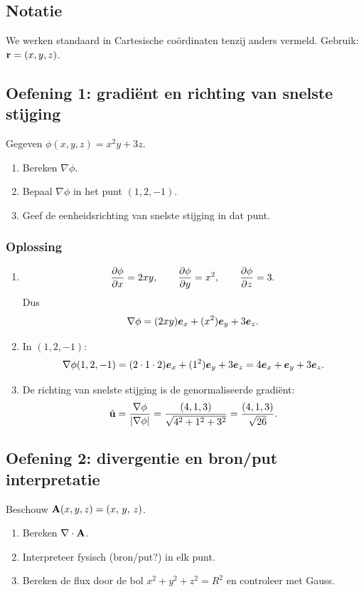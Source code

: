 \documentclass[11pt,a4paper]{article}
\begin{document}
    \subsection*{Notatie}
    We werken standaard in Cartesische co\"ordinaten tenzij anders vermeld.
    Gebruik: \(\vb{r}=(x,y,z)\).


    \subsection{Oefening 1: gradi\"ent en richting van snelste stijging}
    Gegeven \(\phi(x,y,z)=x^2y+3z\).
    \begin{enumerate}
        \item Bereken \(\nabla\phi\).
        \item Bepaal \(\nabla\phi\) in het punt \((1,2,-1)\).
        \item Geef de eenheidsrichting van snelste stijging in dat punt.
    \end{enumerate}

    \subsubsection*{Oplossing}
    \begin{enumerate}
        \item
        \[
            \pdv{\phi}{x}=2xy,\qquad \pdv{\phi}{y}=x^2,\qquad \pdv{\phi}{z}=3.
        \]
        Dus
        \[
            \nabla\phi=(2xy)\vb*{e}_x+(x^2)\vb*{e}_y+3\vb*{e}_z.
        \]
        \item In \((1,2,-1)\):
        \[
            \nabla\phi(1,2,-1) = (2\cdot1\cdot2)\vb*{e}_x + (1^2)\vb*{e}_y + 3\vb*{e}_z
            = 4\vb*{e}_x+\vb*{e}_y+3\vb*{e}_z.
        \]
        \item De richting van snelste stijging is de genormaliseerde gradi\"ent:
        \[
            \hat{\vb{u}} = \frac{\nabla\phi}{\abs{\nabla\phi}}
            = \frac{(4,1,3)}{\sqrt{4^2+1^2+3^2}}
            = \frac{(4,1,3)}{\sqrt{26}}.
        \]
    \end{enumerate}


    \subsection{Oefening 2: divergentie en bron/put interpretatie}
    Beschouw \(\vb{A}(x,y,z)=(x,\,y,\,z)\).
    \begin{enumerate}
        \item Bereken \(\nabla\cdot\vb{A}\).
        \item Interpreteer fysisch (bron/put?) in elk punt.
        \item Bereken de flux door de bol \(x^2+y^2+z^2=R^2\) en controleer met Gauss.
    \end{enumerate}
\end{document}
